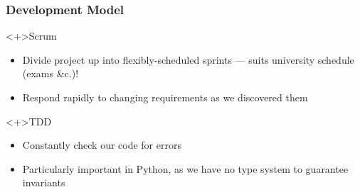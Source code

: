 
\begin{frame}
  \frametitle{Development Model}

  \begin{block}<+>{Scrum}
    \begin{itemize}
      \item Divide project up into flexibly-scheduled sprints ---
        suits university schedule (exams \&c.)!
      \item Respond rapidly to changing requirements as we
        discovered them
    \end{itemize}
  \end{block}

  \begin{block}<+>{TDD}
    \begin{itemize}
      \item Constantly check our code for errors
      \item Particularly important in Python, as we have no type
        system to guarantee invariants
    \end{itemize}
  \end{block}
\end{frame}
